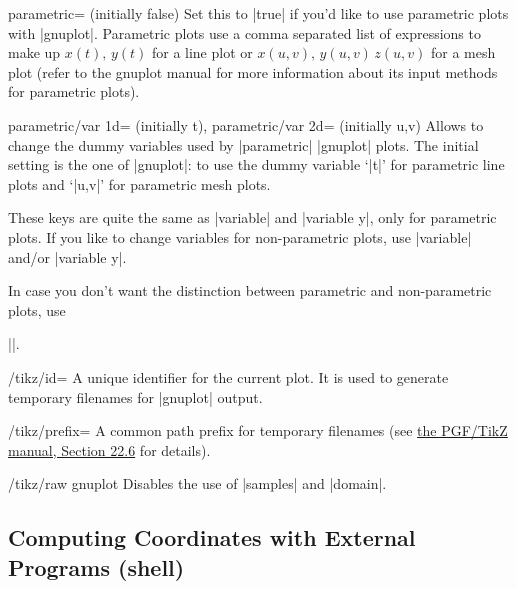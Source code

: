 {\begin{pgfplotskey}{parametric= (initially false)}
    Set this to |true| if you'd like to use parametric plots with |gnuplot|.
    Parametric plots use a comma separated list of expressions to make up
    $x(t),\, y(t)$ for a line plot or $x(u,v), \, y(u,v)\, z(u,v)$ for a mesh
    plot (refer to the gnuplot manual for more information about its input
    methods for parametric plots).
\end{pgfplotskey}

\begin{pgfplotskeylist}{%
    parametric/var 1d= (initially t),
    parametric/var 2d= (initially {u,v})%
}
    Allows to change the dummy variables used by |parametric| |gnuplot| plots.
    The initial setting is the one of |gnuplot|: to use the dummy variable
    `|t|' for parametric line plots and `|u,v|' for parametric mesh plots.

    These keys are quite the same as |variable| and |variable y|, only for
    parametric plots. If you like to change variables for non-parametric plots,
    use |variable| and/or |variable y|.

    In case you don't want the distinction between parametric and
    non-parametric plots, use

    |\pgfplotsset{parametric/var 1d=,parametric/var 2d=}|.
\end{pgfplotskeylist}

\begin{key}{/tikz/id=}
    A unique identifier for the current plot. It is used to generate temporary
    filenames for |gnuplot| output.
\end{key}

\begin{key}{/tikz/prefix=}
    A common path prefix for temporary filenames (see \href{https://tikz.dev/tikz-plots#sec-22.6}{the PGF/TikZ manual, Section 22.6}
    for details).
\end{key}

\begin{key}{/tikz/raw gnuplot}
    Disables the use of |samples| and |domain|.
\end{key}


\subsection{Computing Coordinates with External Programs (shell)}

}
